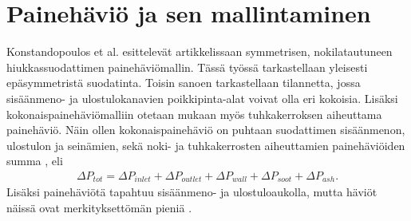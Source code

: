 \section{Painehäviö ja sen mallintaminen}

%     

Konstandopoulos et al. esittelevät artikkelissaan \cite{Konstandopoulos2000} symmetrisen, nokilatautuneen hiukkassuodattimen painehäviömallin. Tässä työssä tarkastellaan yleisesti epäsymmetristä suodatinta. Toisin sanoen tarkastellaan tilannetta, jossa sisäänmeno- ja ulostulokanavien poikkipinta-alat voivat olla eri kokoisia. Lisäksi kokonaispainehäviömalliin otetaan mukaan myös tuhkakerroksen aiheuttama painehäviö. Näin ollen kokonaispainehäviö on puhtaan suodattimen sisäänmenon, ulostulon ja seinämien, sekä noki- ja tuhkakerrosten aiheuttamien painehäviöiden summa \cite{Konstandopoulos2000,Konstandopoulos2008}, eli
\begin{align}
    \Delta P_{tot} = \Delta P_{inlet} +  \Delta P_{outlet} + \Delta P_{wall} + \Delta P_{soot} +  \Delta P_{ash}.
\end{align}
Lisäksi painehäviötä tapahtuu sisäänmeno- ja ulostuloaukolla, mutta häviöt näissä ovat merkityksettömän pieniä \cite{Konstandopoulos2000}.

